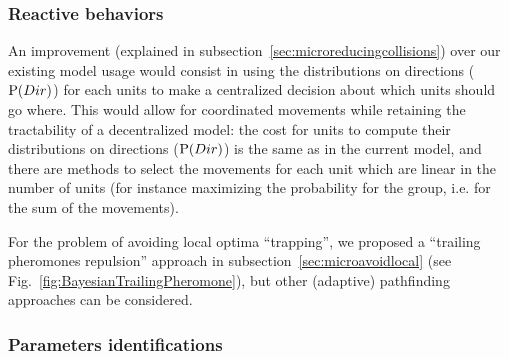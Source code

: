 \subsubsection{Reactive behaviors}
An improvement (explained in subsection~\ref{sec:microreducingcollisions}) over our existing model usage would consist in using the distributions on directions ($\mathrm{P}(Dir)$) for each units to make a centralized decision about which units should go where. This would allow for coordinated movements while retaining the tractability of a decentralized model: the cost for units to compute their distributions on directions ($\mathrm{P}(Dir)$) is the same as in the current model, and there are methods to select the movements for each unit which are linear in the number of units (for instance maximizing the probability for the group, i.e. for the sum of the movements).

For the problem of avoiding local optima ``trapping'', we proposed a ``trailing pheromones repulsion'' approach in subsection~\ref{sec:microavoidlocal} (see Fig.~\ref{fig:BayesianTrailingPheromone}), but other (adaptive) pathfinding approaches can be considered.

\subsubsection{Parameters identifications}

